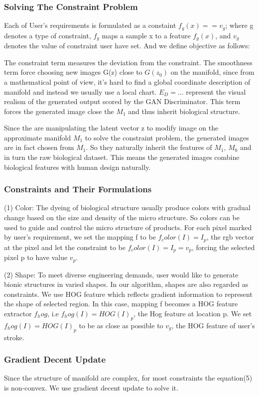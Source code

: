 \subsubsection{Solving The Constraint Problem}
Each of User’s requirements is formulated as a constaint $f_g(x)==v_g$; where g denotes a type of constraint, $f_g$ maps a sample x to a feature $f_g(x)$, and $v_g$ denotes the value of constraint user have set. And we define objective as follows:

The constraint term measures the deviation from the constraint. The smoothness term force choosing new images G(z) close to $G(z_0)$ on the manifold, since from a mathematical point of view, it’s hard to find a global coordinate description of manifold and instead we usually use a local chart. $E_D =…$ represent the visual realism of the generated output scored by the GAN Discriminator. This term forces the generated image close the $M_1$ and thus inherit biological structure. 

Since the are manipulating the latent vector z to modify image on the approximate manifold $M_1$ to solve the constraint problem, the generated images are in fact chosen from $M_1$. So they naturally inherit the features of $M_1$, $M_0$ and in turn the raw biological dataset. This means the generated images combine biological features with human design naturally. 

\subsubsection{Constraints and Their Formulations}

(1) Color: The dyeing of biological structure usually produce colors with gradual change based on the size and density of the micro structure. So colors can be used to guide and control the micro structure of products. For each pixel marked by user’s requirement, we set the mapping f to be $f_color(I) = I_p$, the rgb vector at the pixel and let the constraint to be $f_color(I) = I_p=v_p$, forcing the selected pixel p to have value $v_p$.\

(2) Shape: To meet diverse engineering demands, user would like to generate bionic structures in varied shapes. In our algorithm, shapes are also regarded as constraints. We use HOG feature which reflects gradient information to represent the shape of selected region. In this case, mapping f becomes a HOG feature extractor $f_hog$, i.e $f_hog(I)=HOG(I)_p$, the Hog feature at location p. We set $f_hog(I) = HOG(I)_p$ to be as close as possible to $v_g$, the HOG feature of user’s stroke.

\subsubsection{Gradient Decent Update}
Since the structure of manifold are complex, for most constraints the equation(5) is non-convex. We use gradient decent update to solve it. 